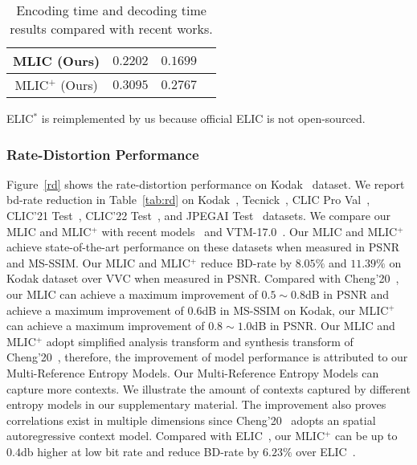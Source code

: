 \documentclass[sigconf]{acmart}
\begin{document}
\begin{table}[t]
\begin{threeparttable}
{\begin{tabular}{@{}c|cccc }
  \multicolumn{2}{c|}{MLIC (Ours)}                                          & $0.2202$  & $0.1699$  \\\midrule
  \multicolumn{2}{c|}{MLIC$^+$ (Ours)}                                      & $0.3095$  & $0.2767$ \\\midrule
  \end{tabular}
  }
  \begin{tablenotes}
  \item\footnotesize{ELIC$^\ast$ is reimplemented by us because official ELIC is not open-sourced.}
  \end{tablenotes}
  \end{threeparttable}
  \caption{Encoding time and decoding time results compared with recent works.}
  \label{Tab:complex}
  \end{table}
\subsubsection{Rate-Distortion Performance}
Figure~\ref{rd} shows the rate-distortion performance on Kodak~\cite{kodak} dataset.
We report bd-rate reduction in Table~\ref{tab:rd} on Kodak~\cite{kodak},
Tecnick~\cite{asuni2014testimages}, CLIC Pro Val~\cite{clic2020dataset},
CLIC'21 Test~\cite{clic2021dataset}, CLIC'22 Test~\cite{clic2022dataset},
and JPEGAI Test~\cite{jpegai} datasets.
We compare our MLIC and MLIC$^+$ with recent
models~\cite{DBLP:conf/cvpr/ChengSTK20, DBLP:conf/icip/MinnenS20,
DBLP:conf/iclr/QianTSLLSHJ21,DBLP:conf/mm/XieCC21,
DBLP:journals/corr/abs-2202-05492,DBLP:journals/corr/abs-2203-08450,
He_2022_CVPR,Wang_2022_CVPR,DBLP:journals/corr/abs-2203-10897, zhu2021transformer,
DBLP:journals/corr/abs-2112-04487, pan2022content, koyuncu2022contextformer}
and VTM-17.0~\cite{vtm2019}.
Our MLIC and MLIC$^+$ achieve state-of-the-art performance on these datasets when measured
in PSNR and MS-SSIM.
Our MLIC and MLIC$^+$ reduce
BD-rate by $8.05\%$ and $11.39\%$ on Kodak dataset over VVC when measured in PSNR.
Compared with Cheng'20~\cite{DBLP:conf/cvpr/ChengSTK20},
our MLIC can achieve a maximum improvement of $0.5\sim0.8$dB in PSNR
and achieve a maximum improvement of $0.6$dB in MS-SSIM on Kodak,
our MLIC$^+$ can achieve a maximum improvement of $0.8\sim1.0$dB in PSNR.
Our MLIC and MLIC$^+$ adopt simplified analysis transform and synthesis transform of
Cheng'20~\cite{DBLP:conf/cvpr/ChengSTK20}, therefore,
the improvement of model performance is attributed to our Multi-Reference Entropy Models.
Our Multi-Reference Entropy Models can capture more contexts.
We illustrate the amount of contexts captured by different entropy models
in our supplementary material.
The improvement also proves correlations exist in multiple dimensions since
Cheng'20~\cite{DBLP:conf/cvpr/ChengSTK20} adopts an spatial autoregressive context model.
Compared with ELIC~\cite{He_2022_CVPR}, our MLIC$^+$ can be up to $0.4$db higher
at low bit rate and reduce BD-rate by $6.23\%$ over ELIC~\cite{He_2022_CVPR}.
\end{document}
